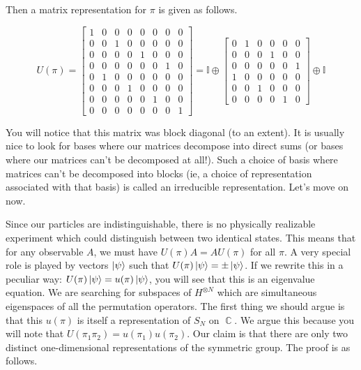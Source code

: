 \documentclass{article}
\DeclareMathOperator{\CC}{\mathbb{C}}
\begin{document}
Then a matrix representation for $\pi$ is given as follows.

\[U(\pi) =  \begin{bmatrix}
1&0&0&0&0&0&0&0\\
0&0&1&0&0&0&0&0\\
0&0&0&0&1&0&0&0\\
0&0&0&0&0&0&1&0\\
0&1&0&0&0&0&0&0\\
0&0&0&1&0&0&0&0\\
0&0&0&0&0&1&0&0\\
0&0&0&0&0&0&0&1
		\end{bmatrix}= \mathbb{I}\oplus
\begin{bmatrix}
0&1&0&0&0&0\\
0&0&0&1&0&0\\
0&0&0&0&0&1\\
1&0&0&0&0&0\\
0&0&1&0&0&0\\
0&0&0&0&1&0
\end{bmatrix}\oplus\mathbb{I}\]

You will notice that this matrix was block diagonal (to an extent). It is usually nice to look for bases where our matrices decompose into direct sums (or bases where our matrices can't be decomposed at all!). Such a choice of basis where matrices can't be decomposed into blocks (ie, a choice of representation associated with that basis) is called an irreducible representation. Let's move on now.

Since our particles are indistinguishable, there is no physically realizable experiment which could distinguish between two identical states. This means that for any observable $A$, we must have $U(\pi) A = A U(\pi)$ for all $\pi$. A very special role is played by vectors $\ket\psi$ such that $U(\pi) \ket{\psi} = \pm \ket{\psi}$. If we rewrite this in a peculiar way: $U(\pi)\ket{\psi} = u(\pi)\ket{\psi}$, you will see that this is an eigenvalue equation. We are searching for subspaces of $H^{\otimes N}$ which are simultaneous eigenspaces of all the permutation operators. The first thing we should argue is that this $u(\pi)$ is itself a representation of $S_N$ on $\CC$. We argue this because you will note that $U(\pi_1\pi_2) = u(\pi_1)u(\pi_2)$. Our claim is that there are only two distinct one-dimensional representations of the symmetric group. The proof is as follows.
\end{document}
